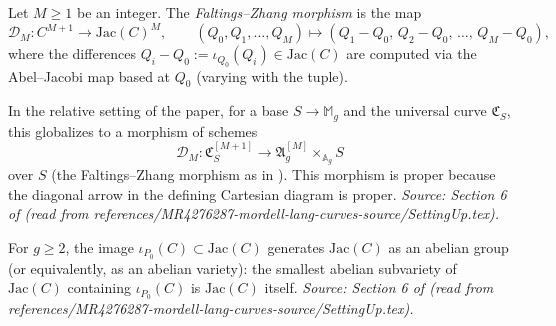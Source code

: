 \begin{definition}
  \label{def:faltings_zhang}
  Let \(M \ge 1\) be an integer. The \emph{Faltings--Zhang morphism} is the map
  \[
    \mathscr{D}_M \colon C^{M+1} \to \mathrm{Jac}(C)^M,
    \qquad
    (Q_0, Q_1, \ldots, Q_M) \mapsto (Q_1 - Q_0,\, Q_2 - Q_0,\, \ldots,\, Q_M - Q_0),
  \]
  where the differences \(Q_i - Q_0 := \iota_{Q_0}(Q_i) \in \mathrm{Jac}(C)\)
  are computed via the Abel--Jacobi map based at \(Q_0\) (varying with the tuple).

  In the relative setting of the paper, for a base \(S \to \mathbb{M}_g\) and the
  universal curve \(\mathfrak{C}_S\), this globalizes to a morphism of schemes
  \[
    \mathscr{D}_M \colon \mathfrak{C}_S^{[M+1]} \to
    \mathfrak{A}_g^{[M]} \times_{\mathbb{A}_g} S
  \]
  over \(S\) (the Faltings--Zhang morphism as in \cite[(\ref*{DefFaltingsZhang3})]{MR4276287-mordell-lang-curves}).
  This morphism is proper because the diagonal arrow in the defining Cartesian
  diagram is proper.
  \textit{Source: Section 6 of \cite{MR4276287-mordell-lang-curves} (read from
  references/MR4276287-mordell-lang-curves-source/SettingUp.tex).}
\end{definition}

\begin{lemma}
  \label{lem:curve_generates_jacobian}
  For \(g \ge 2\), the image \(\iota_{P_0}(C) \subset \mathrm{Jac}(C)\) generates
  \(\mathrm{Jac}(C)\) as an abelian group (or equivalently, as an abelian variety):
  the smallest abelian subvariety of \(\mathrm{Jac}(C)\) containing \(\iota_{P_0}(C)\)
  is \(\mathrm{Jac}(C)\) itself.
  \textit{Source: Section 6 of \cite{MR4276287-mordell-lang-curves} (read from
  references/MR4276287-mordell-lang-curves-source/SettingUp.tex).}
\end{lemma}

